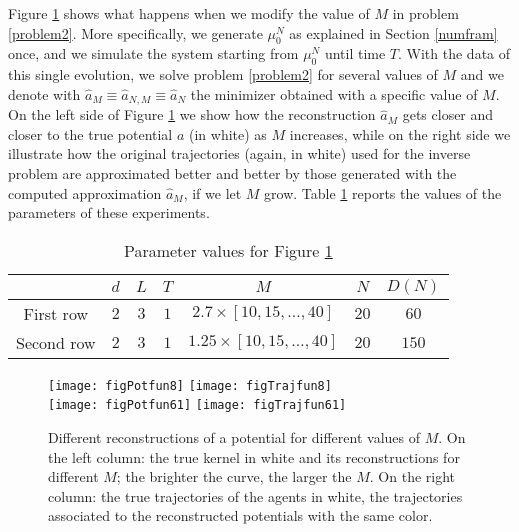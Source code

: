 Figure \ref{Mconstr1} shows what happens when we modify the value of $M$ in problem \eqref{problem2}. More specifically, we generate $\mu^N_0$ as explained in Section \ref{numfram} once, and we simulate the system starting from $\mu^N_0$ until time $T$. With the data of this single evolution, we solve problem \eqref{problem2} for several values of $M$ and we denote with $\widehat{a}_M \equiv \widehat{a}_{N,M} \equiv \widehat{a}_{N}$ the minimizer obtained with a specific value of $M$. On the left side of Figure \ref{Mconstr1} we show how the reconstruction $\widehat{a}_M$ gets closer and closer to the true potential $a$ (in white) as $M$ increases, while on the right side we illustrate how the original trajectories (again, in white) used for the inverse problem are approximated better and better by those generated with the computed approximation $\widehat{a}_M$, if we let $M$ grow. Table \ref{tab:figM} reports the values of the parameters of these experiments.

\begin{table}[h]
\begin{center}
\begin{tabular}{ |c|c|c|c|c|c|c| }
\hline
 & $d$ & $L$ & $T$ & $M$ & $N$ & $D(N)$ \\
\hline
\hline
 First row & $2$ & $3$ & $1$ & $2.7 \times [10,15,\ldots,40]$ & $20$ & $60$ \\
\hline
 Second row & $2$ & $3$ & $1$ & $1.25 \times [10,15,\ldots,40]$ & $20$ & $150$ \\
\hline
\end{tabular}
\end{center}
\vspace{-0.5cm}
\caption{Parameter values for Figure \ref{Mconstr1} } \label{tab:figM} 
\end{table}

\begin{figure}[h!]
\begin{center}
\hspace{-0.7cm}\texttt{[image: figPotfun8]}\hspace{-0.9cm}
\texttt{[image: figTrajfun8]}\\
\hspace{-0.7cm}\texttt{[image: figPotfun61]}\hspace{-0.9cm}
\texttt{[image: figTrajfun61]}
\end{center}
\caption{Different reconstructions of a potential for different values of $M$. On the left column: the true kernel in white and its reconstructions for different $M$; the brighter the curve, the larger the $M$. On the right column: the true trajectories of the agents in white, the trajectories associated to the reconstructed potentials with the same color.}\label{Mconstr1}
\end{figure}

